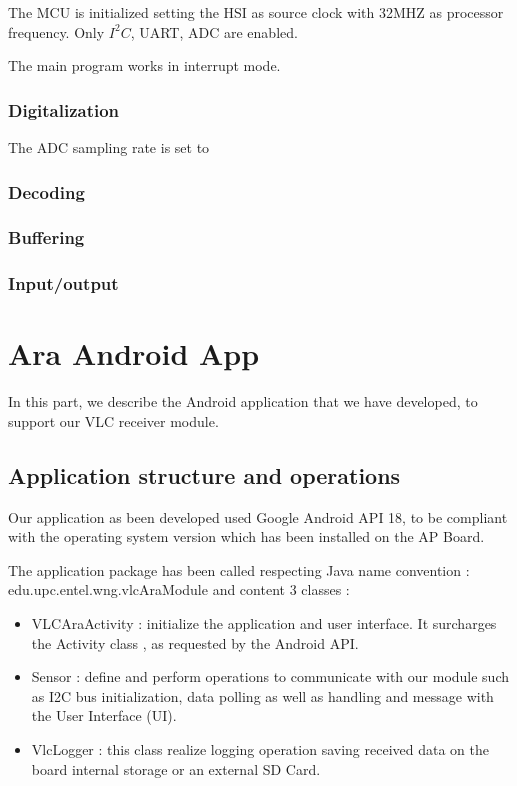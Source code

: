 The MCU is initialized setting the HSI as source clock with 32MHZ as processor frequency. Only $I^2C$, UART, ADC are enabled.

The main program works in interrupt mode. 

\subsubsection{Digitalization}

The ADC sampling rate is set to 
\subsubsection{Decoding}

\subsubsection{Buffering}

\subsubsection{Input/output}


\section{Ara Android App}

In this part, we describe the Android application that we have developed, to support our VLC receiver module.

\subsection{Application structure and operations}
Our application as been developed used Google Android API 18, to be compliant with the operating system version which has been installed on the AP Board.

The application package has been called respecting Java name convention : edu.upc.entel.wng.vlcAraModule and content 3 classes :

\begin{itemize}
\item VLCAraActivity : initialize the application and user interface. It surcharges the Activity class , as requested by the Android API.
\item Sensor : define and perform operations to communicate with our module such as I2C bus initialization, data polling as well as handling and message with the User Interface (UI).
\item VlcLogger : this class realize logging operation saving received data on the board internal storage or an external SD Card.
\end{itemize}

